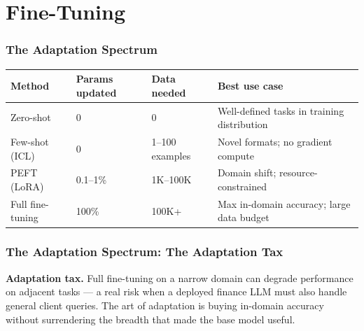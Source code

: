 \documentclass[9pt,t]{beamer}
\begin{document}
\section{Fine-Tuning}

\begin{frame}
\frametitle{The Adaptation Spectrum}

\begin{center}
\begin{tabular}{p{2.6cm}p{2.3cm}p{2.3cm}p{2.5cm}}
\toprule
\textbf{Method} & \textbf{Params updated} & \textbf{Data needed} & \textbf{Best use case} \\
\midrule
Zero-shot        & 0        & 0              & Well-defined tasks in training distribution \\[4pt]
Few-shot (ICL)   & 0        & 1--100 examples & Novel formats; no gradient compute \\[4pt]
PEFT (LoRA)      & 0.1--1\% & 1K--100K       & Domain shift; resource-constrained \\[4pt]
Full fine-tuning & 100\%    & 100K+          & Max in-domain accuracy; large data budget \\
\bottomrule
\end{tabular}
\end{center}
\end{frame}

\begin{frame}
\frametitle{The Adaptation Spectrum: The Adaptation Tax}

\begin{bigpicture}
  \textbf{Adaptation tax.} Full fine-tuning on a narrow domain can degrade performance
  on adjacent tasks --- a real risk when a deployed finance LLM must also handle general
  client queries. The art of adaptation is buying in-domain accuracy without
  surrendering the breadth that made the base model useful.
\end{bigpicture}
\end{frame}
\end{document}
